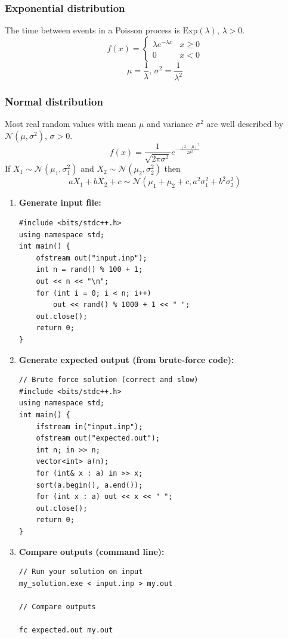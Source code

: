 \subsubsection{Exponential distribution}
The time between events in a Poisson process is $\textrm{Exp}(\lambda),\,\lambda>0$.
\[f(x) = \left\{
\begin{array}{cl}
\lambda e^{-\lambda x} & x\geq0\\
0 & x<0
\end{array}\right.\]
\[\mu=\frac{1}{\lambda},\,\sigma^2=\frac{1}{\lambda^2}\]

\subsubsection{Normal distribution}
Most real random values with mean $\mu$ and variance $\sigma^2$ are well described by $\mathcal{N}(\mu,\sigma^2),\,\sigma>0$.
\[ f(x) = \frac{1}{\sqrt{2\pi\sigma^2}}e^{-\frac{(x-\mu)^2}{2\sigma^2}} \]
If $X_1 \sim \mathcal{N}(\mu_1,\sigma_1^2)$ and $X_2 \sim \mathcal{N}(\mu_2,\sigma_2^2)$ then
\[ aX_1 + bX_2 + c \sim \mathcal{N}(\mu_1+\mu_2+c,a^2\sigma_1^2+b^2\sigma_2^2) \]

\begin{enumerate}
  \item \textbf{Generate input file:}
  \begin{verbatim}
#include <bits/stdc++.h>
using namespace std;
int main() {
    ofstream out("input.inp");
    int n = rand() % 100 + 1;
    out << n << "\n";
    for (int i = 0; i < n; i++)
        out << rand() % 1000 + 1 << " ";
    out.close();
    return 0;
}
  \end{verbatim}

  \item \textbf{Generate expected output (from brute-force code):}
  \begin{verbatim}
// Brute force solution (correct and slow)
#include <bits/stdc++.h>
using namespace std;
int main() {
    ifstream in("input.inp");
    ofstream out("expected.out");
    int n; in >> n;
    vector<int> a(n);
    for (int& x : a) in >> x;
    sort(a.begin(), a.end());
    for (int x : a) out << x << " ";
    out.close();
    return 0;
}
  \end{verbatim}

  \item \textbf{Compare outputs (command line):}
  \begin{verbatim}
// Run your solution on input
my_solution.exe < input.inp > my.out

// Compare outputs

fc expected.out my.out
  \end{verbatim}
\end{enumerate}
